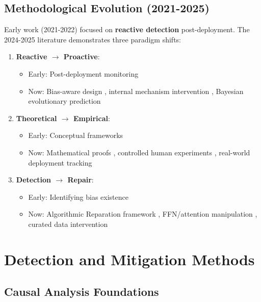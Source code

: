\documentclass[11pt,a4paper]{article}
\begin{document}
\subsection{Methodological Evolution (2021-2025)}

Early work (2021-2022) focused on \textbf{reactive detection} post-deployment. The 2024-2025 literature demonstrates three paradigm shifts:

\begin{enumerate}
    \item \textbf{Reactive $\rightarrow$ Proactive}:
    \begin{itemize}
        \item Early: Post-deployment monitoring \cite{mehrabi2021,varoquaux2022}
        \item Now: Bias-aware design \cite{wyllie2024}, internal mechanism intervention \cite{zhou2024}, Bayesian evolutionary prediction \cite{ren2024}
    \end{itemize}
    
    \item \textbf{Theoretical $\rightarrow$ Empirical}:
    \begin{itemize}
        \item Early: Conceptual frameworks \cite{mehrabi2021,ferrara2023}
        \item Now: Mathematical proofs \cite{shumailov2024}, controlled human experiments \cite{glickman2024}, real-world deployment tracking \cite{nestor2024}
    \end{itemize}
    
    \item \textbf{Detection $\rightarrow$ Repair}:
    \begin{itemize}
        \item Early: Identifying bias existence \cite{mehrabi2021,varoquaux2022}
        \item Now: Algorithmic Reparation framework \cite{wyllie2024}, FFN/attention manipulation \cite{zhou2024}, curated data intervention \cite{ren2024}
    \end{itemize}
\end{enumerate}

\section{Detection and Mitigation Methods}

\subsection{Causal Analysis Foundations}
\end{document}
